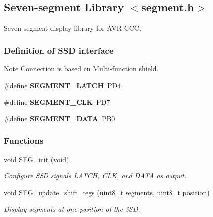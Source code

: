 \hypertarget{a00012}{}\subsection{Seven-\/segment Library $<$segment.\+h$>$}
\label{a00012}


Seven-\/segment display library for A\+V\+R-\/\+G\+CC.  


\subsubsection*{Definition of S\+SD interface}
\label{_amgrpdf5f6bef3d78097d2a76bc3ea614e2ec}%
\begin{DoxyNote}{Note}
Connection is based on Multi-\/function shield. 
\end{DoxyNote}
\begin{DoxyCompactItemize}
\item 
\#define {\bfseries S\+E\+G\+M\+E\+N\+T\+\_\+\+L\+A\+T\+CH}~P\+D4\hypertarget{a00012_ga59be46ac20d02453c1374cc90a28b25e}{}\label{a00012_ga59be46ac20d02453c1374cc90a28b25e}

\item 
\#define {\bfseries S\+E\+G\+M\+E\+N\+T\+\_\+\+C\+LK}~P\+D7\hypertarget{a00012_ga6406c9d48869a0e3863971db22c25be3}{}\label{a00012_ga6406c9d48869a0e3863971db22c25be3}

\item 
\#define {\bfseries S\+E\+G\+M\+E\+N\+T\+\_\+\+D\+A\+TA}~P\+B0\hypertarget{a00012_ga962a093435b53a7b4ecf7312c7ceaf00}{}\label{a00012_ga962a093435b53a7b4ecf7312c7ceaf00}

\end{DoxyCompactItemize}
\subsubsection*{Functions}
\begin{DoxyCompactItemize}
\item 
void \hyperlink{a00012_gacaabc905da11e7772ffa6a75e156964f}{S\+E\+G\+\_\+init} (void)
\begin{DoxyCompactList}\small\item\em Configure S\+SD signals L\+A\+T\+CH, C\+LK, and D\+A\+TA as output. \end{DoxyCompactList}\item 
void \hyperlink{a00012_gaf988da91cec04913e9d76e9089e9d4c4}{S\+E\+G\+\_\+update\+\_\+shift\+\_\+regs} (uint8\+\_\+t segments, uint8\+\_\+t position)
\begin{DoxyCompactList}\small\item\em Display segments at one position of the S\+SD. \end{DoxyCompactList}\end{DoxyCompactItemize}


